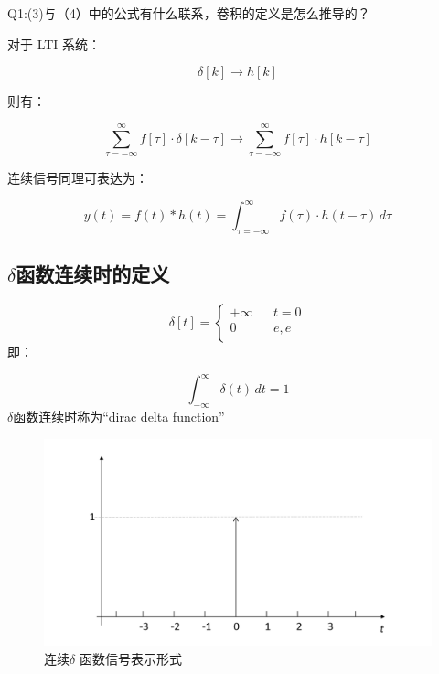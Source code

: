 \documentclass[UTF8]{ctexart}
\begin{document}
Q1:(3)与（4）中的公式有什么联系，卷积的定义是怎么推导的？\par
对于 LTI 系统：\par
\[ \delta [ k] \longrightarrow h [ k]  \]\par
则有：\par
\[ \sum_{\tau =-\infty}^{\infty} f[\tau  ]\cdot \delta [ k-\tau ] \longrightarrow \sum_{\tau =-\infty}^{\infty} f[\tau  ]\cdot h [ k-\tau ]  \]\par
连续信号同理可表达为：\par
\[ y(t)=f(t)\ast h(t) =  \int_{\tau =-\infty}^{\infty} f(\tau )\cdot h (t-\tau  ) \,d\tau \]\par

\subsection{$\delta $函数连续时的定义}
\[  \delta [ t] =\left\{ \begin{array}{rcl}
    +\infty & & {t=0}\\
    0 & & {e,e}\\
    \end{array} \right. \]
即：\par
\[ \int_{-\infty}^{\infty}\delta (t)  \,dt=1 \]
$\delta $函数连续时称为“dirac delta function”\par
\begin{figure}[h]
    \centering         %
    \includegraphics[scale=0.4]{2.png}
    \caption{连续$\delta $ 函数信号表示形式}
\end{figure}
\end{document}
